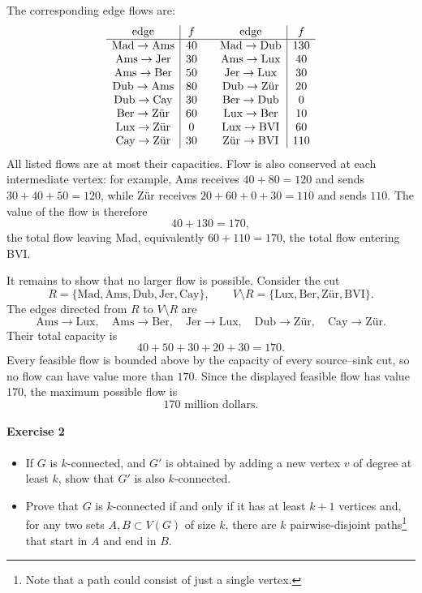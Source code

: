 \documentclass[a4paper,12pt]{article}
\begin{document}
The corresponding edge flows are:
\[
\begin{array}{c|c@{\qquad}c|c}
\text{edge} & f & \text{edge} & f \\ \hline
\text{Mad}\to\text{Ams} & 40 & \text{Mad}\to\text{Dub} & 130 \\
\text{Ams}\to\text{Jer} & 30 & \text{Ams}\to\text{Lux} & 40 \\
\text{Ams}\to\text{Ber} & 50 & \text{Jer}\to\text{Lux} & 30 \\
\text{Dub}\to\text{Ams} & 80 & \text{Dub}\to\text{Z\"ur} & 20 \\
\text{Dub}\to\text{Cay} & 30 & \text{Ber}\to\text{Dub} & 0 \\
\text{Ber}\to\text{Z\"ur} & 60 & \text{Lux}\to\text{Ber} & 10 \\
\text{Lux}\to\text{Z\"ur} & 0 & \text{Lux}\to\text{BVI} & 60 \\
\text{Cay}\to\text{Z\"ur} & 30 & \text{Z\"ur}\to\text{BVI} & 110
\end{array}
\]
All listed flows are at most their capacities.  Flow is also conserved at each
intermediate vertex: for example, Ams receives $40+80=120$ and sends
$30+40+50=120$, while Z\"ur receives $20+60+0+30=110$ and sends $110$.
The value of the flow is therefore
\[
40+130=170,
\]
the total flow leaving Mad, equivalently $60+110=170$, the total flow entering
BVI.

It remains to show that no larger flow is possible.  Consider the cut
\[
R=\{\text{Mad},\text{Ams},\text{Dub},\text{Jer},\text{Cay}\},
\qquad
V\setminus R=\{\text{Lux},\text{Ber},\text{Z\"ur},\text{BVI}\}.
\]
The edges directed from $R$ to $V\setminus R$ are
\[
\text{Ams}\to\text{Lux},\quad
\text{Ams}\to\text{Ber},\quad
\text{Jer}\to\text{Lux},\quad
\text{Dub}\to\text{Z\"ur},\quad
\text{Cay}\to\text{Z\"ur}.
\]
Their total capacity is
\[
40+50+30+20+30=170.
\]
Every feasible flow is bounded above by the capacity of every source--sink cut,
so no flow can have value more than $170$.  Since the displayed feasible flow
has value $170$, the maximum possible flow is
\[
\boxed{170\text{ million dollars}}.
\]

\paragraph{Exercise 2}
\begin{itemize}
	\item[(a)] If $G$ is $k$-connected, and $G'$ is obtained by adding a new vertex $v$ of degree at least $k$, show that $G'$ is also $k$-connected.
	\item[(b)] Prove that $G$ is $k$-connected if and only if it has at least $k+1$ vertices and, for any two sets $A, B \subset V(G)$ of size $k$, there are $k$ pairwise-disjoint paths\footnote{Note that a path could consist of just a single vertex.} that start in $A$ and end in $B$.
\end{itemize}
\end{document}
